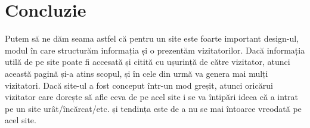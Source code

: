 \documentclass[12pt]{article} %
\begin{document}

\section{Concluzie} %

Putem să ne dăm seama astfel că pentru un site este foarte important design-ul, modul în
care structurăm informația și o prezentăm vizitatorilor. Dacă informația utilă de pe site
poate fi accesată și citită cu ușurință de către vizitator, atunci această pagină și-a
atins scopul, și în cele din urmă va genera mai mulți vizitatori. Dacă site-ul a fost
conceput într-un mod greșit, atunci oricărui vizitator care dorește să afle ceva de pe
acel site i se va întipări ideea că a intrat pe un site urât/încărcat/etc. și tendința
este de a nu se mai întoarce vreodată pe acel site.

\newpage %

{}


\end{document}
